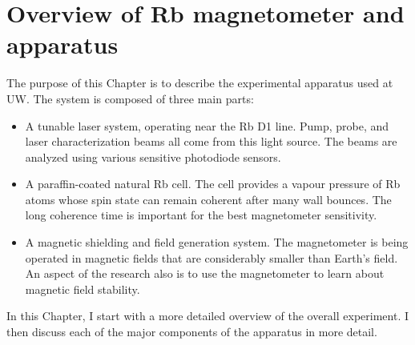 \chapter{Overview of Rb magnetometer and apparatus}


The purpose of this Chapter is to describe the experimental apparatus
used at UW.
The system is composed of three main parts:
\begin{itemize}
\item A tunable laser system, operating near the Rb D1 line.  Pump,
  probe, and laser characterization beams all come from this light
  source.  The beams are analyzed using various sensitive photodiode
  sensors.
\item A paraffin-coated natural Rb cell.  The cell provides a vapour
  pressure of Rb atoms whose spin state can remain coherent after many
  wall bounces.  The long coherence time is important for the best
  magnetometer sensitivity.
\item A magnetic shielding and field generation system.  The
  magnetometer is being operated in magnetic fields that are
  considerably smaller than Earth's field.  An aspect of the research
  also is to use the magnetometer to learn about magnetic field
  stability.
\end{itemize}
In this Chapter, I start with a more detailed overview of the overall
experiment.  I then discuss each of the major components of the
apparatus in more detail.

